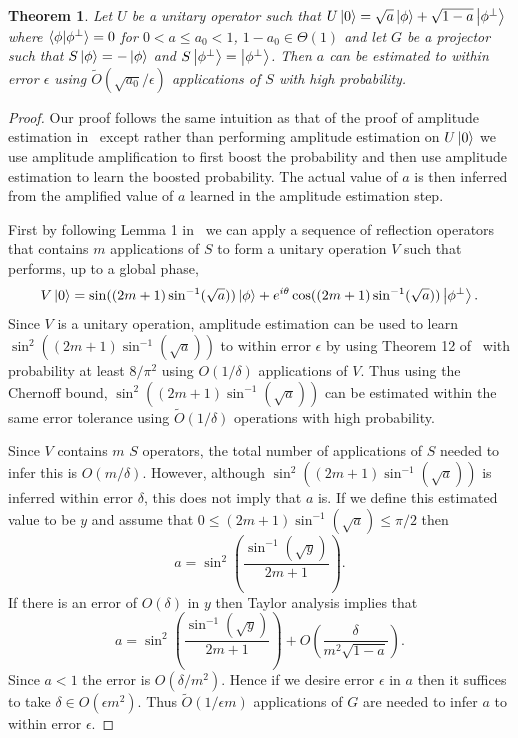 \documentclass[aps,amsmath,onecolumn,amssymb]{revtex4}
\newtheorem{theorem}{Theorem}
\begin{document}
\begin{theorem}
Let $U$ be a unitary operator such that $U\left|0\right\rangle=\sqrt{a}\left|\phi\right\rangle + \sqrt{1-a}\left|\phi^\perp\right\rangle$ where $\langle\phi|\phi^\perp\rangle=0$ for $0<a\le a_0<1$, $1-a_0\in \Theta(1)$ and let $G$ be a projector such that $S\left|\phi\right\rangle=-\left|\phi\right\rangle$ and $S\left|\phi^\perp\right\rangle=\left|\phi^\perp\right\rangle$.  Then $a$ can be estimated to within error $\epsilon$ using $\tilde{O}(\sqrt{a_0}/\epsilon)$ applications of $S$ with high probability.\label{thm:priorAmpEst}
\end{theorem}
\begin{proof}
Our proof follows the same intuition as that of the proof of amplitude estimation in~\cite{BHM+02} except rather than performing amplitude estimation on $U\left|0\right\rangle$ we use amplitude amplification to first boost the probability and then use amplitude estimation to learn the boosted probability.  The actual value of $a$ is then inferred from the amplified value of $a$ learned in the amplitude estimation step.

First by following Lemma 1 in~\cite{BHM+02} we can apply a sequence of reflection operators that contains $m$ applications of $S$ to form a unitary operation $V$ such that performs, up to a global phase,
\begin{equation}
V\left|0\right\rangle = \sin((2m+1)\sin^{-1}(\sqrt{a}))\left|\phi\right\rangle + e^{i\theta}\cos((2m+1)\sin^{-1}(\sqrt{a}))\left|\phi^\perp\right\rangle.
\end{equation}
Since $V$ is a unitary operation, amplitude estimation can be used to learn $\sin^2((2m+1)\sin^{-1}(\sqrt{a}))$ to within error $\epsilon$ by using Theorem 12 of~\cite{BHM+02} with probability at least $8/\pi^2$ using $O(1/\delta)$ applications of $V$.  Thus using the Chernoff bound, $\sin^2((2m+1)\sin^{-1}(\sqrt{a}))$ can be estimated within the same error tolerance using $\tilde{O}(1/\delta)$ operations with high probability.

Since $V$ contains $m$ $S$ operators, the total number of applications of $S$ needed to infer this is $O(m/\delta)$.  However, although $\sin^2((2m+1)\sin^{-1}(\sqrt{a}))$ is inferred within error $\delta$, this does not imply that $a$ is.  If we define this estimated value to be $y$ and assume that $0\le (2m+1)\sin^{-1}(\sqrt{a}) \le \pi/2$ then
\begin{equation}
a = \sin^2\left(\frac{\sin^{-1}(\sqrt{y})}{2m+1}\right).\label{eq:aeq}
\end{equation}
If there is an error of $O(\delta)$ in $y$ then Taylor analysis implies that
\begin{equation}
a=\sin^2\left(\frac{\sin^{-1}(\sqrt{y})}{2m+1}\right) + O\left(\frac{\delta}{m^2\sqrt{1-a}} \right).
\end{equation}
Since $a<1$ the error is $O(\delta/m^2)$.  Hence if we desire error $\epsilon$ in $a$ then it suffices to take $\delta\in O(\epsilon m^2)$.  Thus $\tilde O(1/\epsilon m)$ applications of $G$ are needed to infer $a$ to within error $\epsilon$.


\end{proof}
\end{document}
